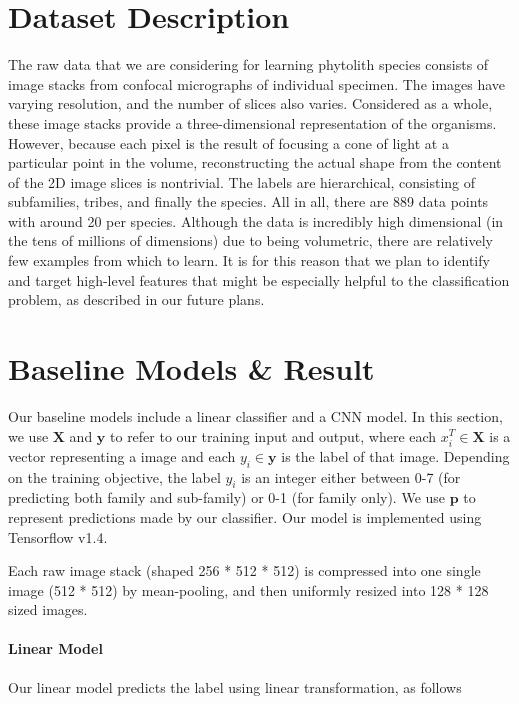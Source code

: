 \documentclass{article}
\begin{document}
\section{Dataset Description}

The raw data that we are considering for learning phytolith species consists of image stacks from confocal micrographs of individual specimen. The images have varying resolution, and the number of slices also varies. Considered as a whole, these image stacks provide a three-dimensional representation of the organisms. However, because each pixel is the result of focusing a cone of light at a particular point in the volume, reconstructing the actual shape from the content of the 2D image slices is nontrivial.
The labels are hierarchical, consisting of subfamilies, tribes, and finally the species. All in all, there are 889 data points with around 20 per species. Although the data is incredibly high dimensional (in the tens of millions of dimensions) due to being volumetric, there are relatively few examples from which to learn. It is for this reason that we plan to identify and target high-level features that might be especially helpful to the classification problem, as described in our future plans.


\section{Baseline Models \& Result}

Our baseline models include a linear classifier and a CNN model. In this section, we use $\mathbf{X}$ and $\mathbf{y}$ to refer to our training input and output, where each ${x}_i^T\in \mathbf{X}$ is a vector representing a image and each ${y_i}\in \mathbf{y}$ is the label of that image. Depending on the training objective, the label $y_i$ is an integer either between 0-7 (for predicting both family and sub-family) or 0-1 (for family only). We use $\mathbf{p}$ to represent predictions made by our classifier. Our model is implemented using Tensorflow v1.4.

Each raw image stack (shaped 256 * 512 * 512) is compressed into one single image (512 * 512) by mean-pooling, and then uniformly resized into 128 * 128 sized images.

\paragraph{Linear Model}

Our linear model predicts the label using linear transformation, as follows
\end{document}
